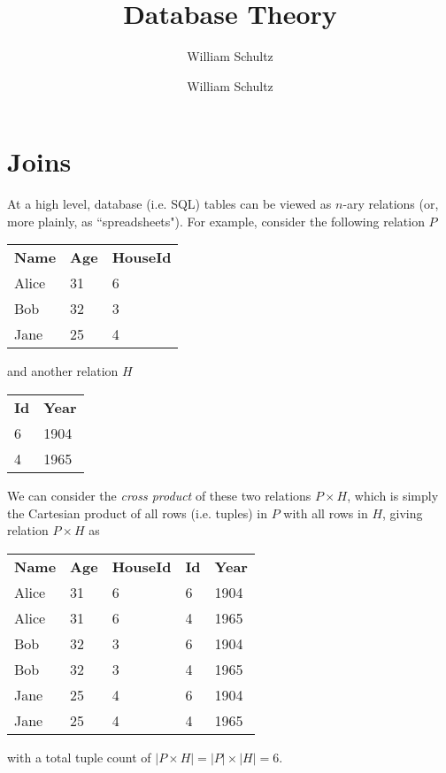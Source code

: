 \documentclass[10pt,a4paper]{article}
\author{William Schultz}
\begin{document}
\title{Database Theory}
\author{William Schultz}
\maketitle

\section*{Joins}

At a high level, database (i.e. SQL) tables can be viewed as $n$-ary relations (or, more plainly, as ``spreadsheets"). For example, consider the following relation $P$
\begin{center}
\begin{tabular}{| l | l | l |}
     \textbf{Name} & \textbf{Age} & \textbf{HouseId} \\ 
     Alice & 31 & 6 \\  
     Bob & 32 & 3 \\    
     Jane & 25 & 4    
\end{tabular}
\end{center}
and another relation $H$
\begin{center}
    \begin{tabular}{| l | l |}
         \textbf{Id} & \textbf{Year} \\ 
         6 & 1904 \\ 
         4 & 1965 
\end{tabular}
\end{center}
We can consider the \textit{cross product} of these two relations $P \times H$, which is simply the Cartesian product of all rows (i.e. tuples) in $P$ with all rows in $H$, giving relation $P \times H$ as
\begin{center}
    \begin{tabular}{| l | l | l | l | l |}
        \textbf{Name} & \textbf{Age}& \textbf{HouseId} & \textbf{Id} & \textbf{Year} \\
        Alice & 31 & 6 & 6 & 1904\\  
        Alice & 31 & 6 & 4 & 1965 \\  
        Bob & 32 & 3 & 6 & 1904 \\    
        Bob & 32 & 3 & 4 & 1965  \\    
        Jane & 25 & 4 & 6 & 1904  \\
        Jane & 25 & 4 & 4 & 1965   
\end{tabular}
\end{center}
with a total tuple count of $|P \times H| = |P| \times |H| = 6$.
\end{document}
